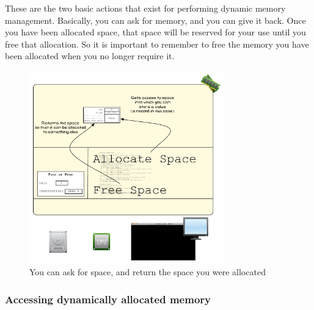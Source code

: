These are the two basic actions that exist for performing dynamic memory management. Basically, you can ask for memory, and you can give it back. Once you have been allocated space, that space will be reserved for your use until you free that allocation. So it is important to remember to free the memory you have been allocated when you no longer require it.

\begin{figure}[h]
   \centering
   \includegraphics[width=0.75\textwidth]{./topics/dynamic-memory/diagrams/HeapAlloc} 
   \caption{You can ask for space, and return the space you were allocated}
   \label{fig:heap-alloc}
\end{figure}



\clearpage
\subsubsection{Accessing dynamically allocated memory} %
\label{ssub:accessing_dynamically_allocated_memory}

